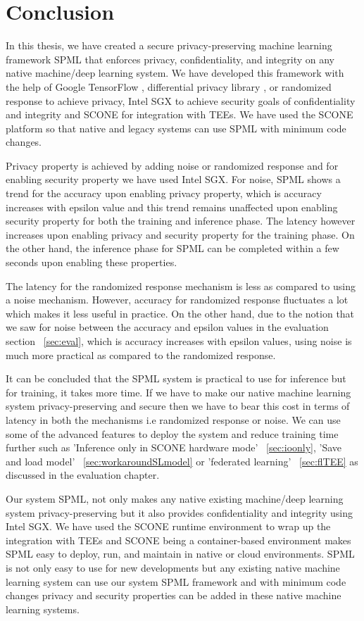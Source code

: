 \chapter{Conclusion}
\label{sec:conclusion}
In this thesis, we have created a secure privacy-preserving machine learning framework SPML that enforces privacy, confidentiality, and integrity on any native machine/deep learning system. We have developed this framework with the help of Google TensorFlow \cite{24}, differential privacy library \cite{11}, or randomized response to achieve privacy, Intel SGX \cite{9} to achieve security goals of confidentiality and integrity and SCONE \cite{22} for integration with TEEs. We have used the SCONE platform so that native and legacy systems can use SPML with minimum code changes.

Privacy property is achieved by adding noise or randomized response and for enabling security property we have used Intel SGX. For noise, SPML shows a trend for the accuracy upon enabling privacy property, which is accuracy increases with epsilon value and this trend remains unaffected upon enabling security property for both the training and inference phase. The latency however increases upon enabling privacy and security property for the training phase. On the other hand, the inference phase for SPML can be completed within a few seconds upon enabling these properties. 

The latency for the randomized response mechanism is less as compared to using a noise mechanism. However, accuracy for randomized response fluctuates a lot which makes it less useful in practice. On the other hand, due to the notion that we saw for noise between the accuracy and epsilon values in the evaluation section ~\ref{sec:eval}, which is accuracy increases with epsilon values, using noise is much more practical as compared to the randomized response. 

It can be concluded that the SPML system is practical to use for inference but for training, it takes more time. If we have to make our native machine learning system privacy-preserving and secure then we have to bear this cost in terms of latency in both the mechanisms i.e randomized response or noise. We can use some of the advanced features to deploy the system and reduce training time further such as 'Inference only in SCONE hardware mode' ~\ref{sec:ioonly}, 'Save and load model' ~\ref{sec:workaroundSLmodel} or 'federated learning' ~\ref{sec:flTEE} as discussed in the evaluation chapter.

Our system SPML, not only makes any native existing machine/deep learning system privacy-preserving but it also provides confidentiality and integrity using Intel SGX. We have used the SCONE runtime environment to wrap up the integration with TEEs and SCONE being a container-based environment makes SPML easy to deploy, run, and maintain in native or cloud environments. SPML is not only easy to use for new developments but any existing native machine learning system can use our system SPML framework and with minimum code changes privacy and security properties can be added in these native machine learning systems.